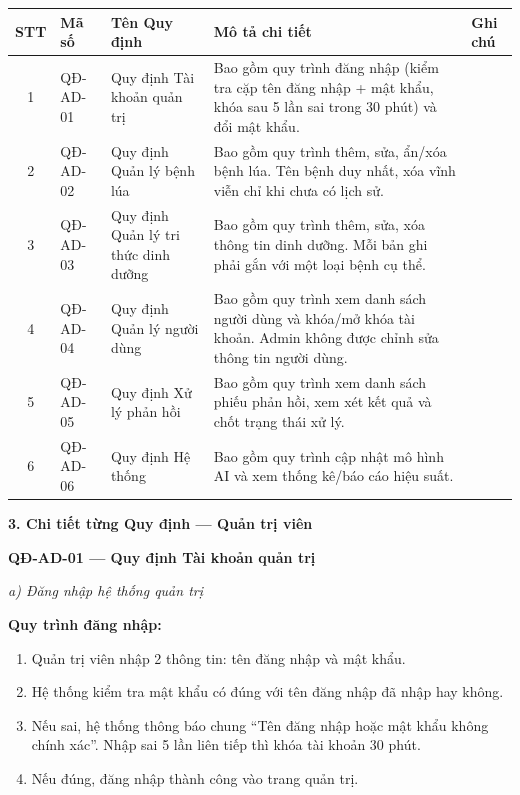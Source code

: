 ﻿\documentclass[12pt,a4paper]{article}
\begin{document}
\begin{longtable}{|c|p{2cm}|p{3.5cm}|p{6cm}|p{1cm}|}
\hline
\rowcolor{headerblue}
\textbf{STT} & \textbf{Mã số} & \textbf{Tên Quy định} & \textbf{Mô tả chi tiết} & \textbf{Ghi chú} \\
\hline
\endhead
1 & QĐ-AD-01 & Quy định Tài khoản quản trị & Bao gồm quy trình đăng nhập (kiểm tra cặp tên đăng nhập + mật khẩu, khóa sau 5 lần sai trong 30 phút) và đổi mật khẩu. & \\
\hline
2 & QĐ-AD-02 & Quy định Quản lý bệnh lúa & Bao gồm quy trình thêm, sửa, ẩn/xóa bệnh lúa. Tên bệnh duy nhất, xóa vĩnh viễn chỉ khi chưa có lịch sử. & \\
\hline
3 & QĐ-AD-03 & Quy định Quản lý tri thức dinh dưỡng & Bao gồm quy trình thêm, sửa, xóa thông tin dinh dưỡng. Mỗi bản ghi phải gắn với một loại bệnh cụ thể. & \\
\hline
4 & QĐ-AD-04 & Quy định Quản lý người dùng & Bao gồm quy trình xem danh sách người dùng và khóa/mở khóa tài khoản. Admin không được chỉnh sửa thông tin người dùng. & \\
\hline
5 & QĐ-AD-05 & Quy định Xử lý phản hồi & Bao gồm quy trình xem danh sách phiếu phản hồi, xem xét kết quả và chốt trạng thái xử lý. & \\
\hline
6 & QĐ-AD-06 & Quy định Hệ thống & Bao gồm quy trình cập nhật mô hình AI và xem thống kê/báo cáo hiệu suất. & \\
\hline
\end{longtable}

\vspace{0.3cm}
\textbf{3. Chi tiết từng Quy định --- Quản trị viên}

\vspace{0.3cm}
\noindent\textbf{QĐ-AD-01 --- Quy định Tài khoản quản trị}

\noindent\textit{a) Đăng nhập hệ thống quản trị}

\noindent\textbf{Quy trình đăng nhập:}
\begin{enumerate}
    \item Quản trị viên nhập 2 thông tin: tên đăng nhập và mật khẩu.
    \item Hệ thống kiểm tra mật khẩu có đúng với tên đăng nhập đã nhập hay không.
    \item Nếu sai, hệ thống thông báo chung ``Tên đăng nhập hoặc mật khẩu không chính xác''. Nhập sai 5 lần liên tiếp thì khóa tài khoản 30 phút.
    \item Nếu đúng, đăng nhập thành công vào trang quản trị.
\end{enumerate}
\end{document}
